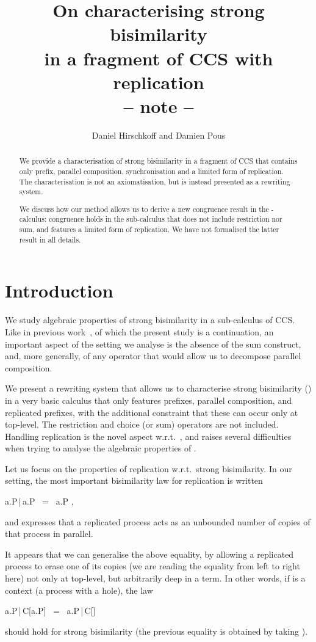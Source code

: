 \documentclass{llncs}
\title{On characterising strong bisimilarity\\
  in a fragment of CCS with replication\\
  -- note --}
\date{}
\author{Daniel Hirschkoff\inst{1} and Damien Pous\inst{2}}
\institute{ENS Lyon, Universit\'e de Lyon, CNRS, INRIA \and SARDES,
  LIG, Grenoble, CNRS, INRIA}
\begin{document}
\maketitle

\begin{abstract}
  We provide a characterisation of strong bisimilarity in a fragment
  of CCS that contains only prefix, parallel composition,
  synchronisation and a limited form of replication. The
  characterisation is not an axiomatisation, but is instead presented
  as a rewriting system.

  We discuss how our method allows us to derive a new congruence
  result in the -calculus: congruence holds in the sub-calculus
  that does not include restriction nor sum, and features a limited
  form of replication. We have not formalised the latter result in all
  details.
\end{abstract}

\section{Introduction}

We study algebraic properties of strong bisimilarity in a sub-calculus
of CCS. Like in previous work~\cite{hirschkoff:pous:lmcs:08}, of which
the present study is a continuation, an important aspect of the
setting we analyse is the absence of the sum construct, and, more
generally, of any operator that would allow us to decompose parallel
composition.


We present a rewriting system that allows us to characterise 
strong bisimilarity () in a very basic calculus that only
features prefixes, parallel composition, and replicated prefixes, with
the additional constraint that these can occur only at top-level. The
restriction and choice (or sum) operators are not included.  Handling
replication is the novel aspect w.r.t.\
\cite{hirschkoff:pous:lmcs:08}, and raises several difficulties when
trying to analyse the algebraic properties of .

Let us focus on the properties of replication w.r.t.\ strong
bisimilarity. In our setting, the most important bisimilarity law for
replication is written
\begin{mathpar}
  \!a.P\,|\,a.P ~=~ \!a.P
  \enspace,
\end{mathpar}
\noindent and expresses that a replicated process acts as an
unbounded number of copies of that process in parallel.

It appears that we can generalise the above equality, by allowing a
replicated process to erase one of its copies (we are reading the
equality from left to right here) not only at top-level, but
arbitrarily deep in a term. In other words, if  is a context (a
process with a hole), the law
\begin{mathpar}
  \!a.P\,|\,C[a.P] ~=~ \!a.P\,|\,C[\nil]
\end{mathpar}
\noindent should hold for strong bisimilarity (the previous equality is
obtained by taking ).
\end{document}
